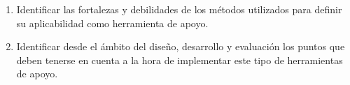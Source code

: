 \begin{enumerate}
    \item Identificar las fortalezas y debilidades de los métodos utilizados
        para definir su aplicabilidad como herramienta de apoyo. 

    \item Identificar desde el ámbito del diseño, desarrollo y evaluación los puntos que deben
        tenerse en cuenta a la hora de implementar este tipo de herramientas de
        apoyo.

\end{enumerate}
